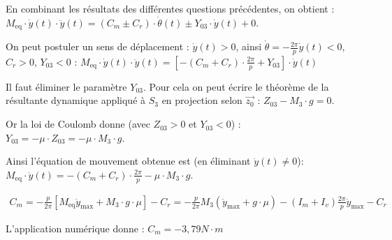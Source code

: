\begin{multicols}{2}
\begin{corrige}
\end{corrige}\else\fi



\ifprof\begin{corrige}
En combinant les résultats des différentes questions précédentes, on obtient : 
$M_{\text{eq}}\cdot \dot{y}(t)\cdot \ddot{y}(t)=\left(C_m\pm C_r\right)\cdot \dot{\theta}(t)\pm Y_{03}\cdot \dot{y}(t)+0
$.

On peut postuler un sens de déplacement : $\dot{y}(t)>0$, ainsi $\dot{\theta}=-\frac{2\pi}{p}\dot{y}(t)<0$,  $C_r>0$, $Y_{03}<0$ : 
$
M_{\text{eq}}\cdot \dot{y}(t)\cdot \ddot{y}(t)=\left[-\left(C_m+ C_r\right)\cdot \frac{2\pi}{p}+ Y_{03}\right]\cdot \dot{y}(t)$
\end{corrige}\else\fi




\ifprof\begin{corrige}
Il faut éliminer le paramètre $Y_{03}$. Pour cela on peut écrire le théorème de la résultante dynamique appliqué à $S_3$ en projection selon $\overrightarrow{z_0}$ : 
$Z_{03}-M_3\cdot g=0$.

Or la loi de Coulomb donne (avec $Z_{03}>0$ et $Y_{03}<0$) : 
$Y_{03}=-\mu\cdot Z_{03}=-\mu\cdot M_3\cdot g$.

Ainsi l'équation de mouvement obtenue est (en éliminant $\dot{y}(t)\neq 0$): 
$
\boxed{
M_{\text{eq}}\cdot \ddot{y}(t)=-\left(C_m+ C_r\right)\cdot \frac{2\pi}{p}- \mu\cdot M_3\cdot g
}$. 
\end{corrige}\else\fi


\ifprof\begin{corrige}
\begin{align*}
C_m=-\frac{p}{2\pi}\left[M_{\text{eq}}\ddot{y}_{\text{max}}+M_3\cdot g\cdot \mu\right]-C_r
=-\frac{p}{2\pi}M_3\left(\ddot{y}_{\text{max}}+g\cdot \mu\right)-\left(I_m+I_v\right)\frac{2\pi}{p}\ddot{y}_{\text{max}}-C_r
\end{align*}

L'application numérique donne  : $C_m=-3,79N\cdot m$
\end{corrige}\else\fi





\end{multicols}

